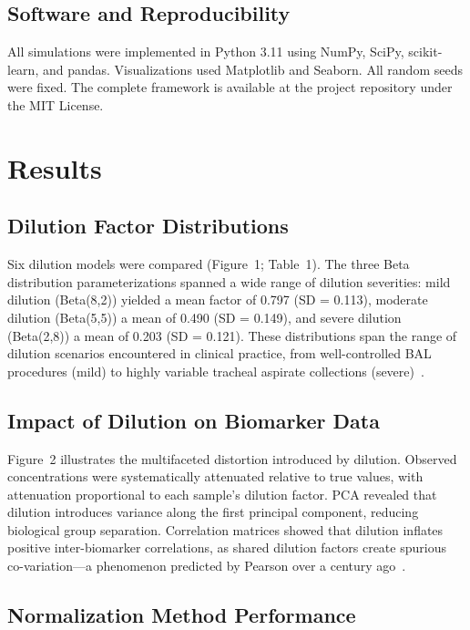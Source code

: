 \documentclass[12pt]{article}
\begin{document}
\subsection{Software and Reproducibility}

All simulations were implemented in Python 3.11 using NumPy, SciPy, scikit-learn, and pandas. Visualizations used Matplotlib and Seaborn. All random seeds were fixed. The complete framework is available at the project repository under the MIT License.

\section{Results}

\subsection{Dilution Factor Distributions}

Six dilution models were compared (Figure~1; Table~1). The three Beta distribution parameterizations spanned a wide range of dilution severities: mild dilution (Beta(8,2)) yielded a mean factor of 0.797 (SD = 0.113), moderate dilution (Beta(5,5)) a mean of 0.490 (SD = 0.149), and severe dilution (Beta(2,8)) a mean of 0.203 (SD = 0.121). These distributions span the range of dilution scenarios encountered in clinical practice, from well-controlled BAL procedures (mild) to highly variable tracheal aspirate collections (severe)~\cite{Rennard1986,Baughman2007}.

\subsection{Impact of Dilution on Biomarker Data}

Figure~2 illustrates the multifaceted distortion introduced by dilution. Observed concentrations were systematically attenuated relative to true values, with attenuation proportional to each sample's dilution factor. PCA revealed that dilution introduces variance along the first principal component, reducing biological group separation. Correlation matrices showed that dilution inflates positive inter-biomarker correlations, as shared dilution factors create spurious co-variation---a phenomenon predicted by Pearson over a century ago~\cite{Pearson1897}.

\subsection{Normalization Method Performance}
\end{document}
